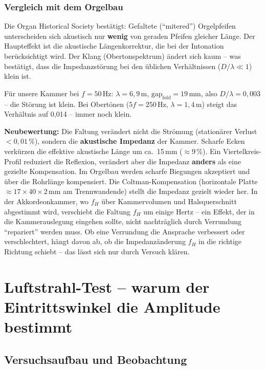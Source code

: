 \documentclass[11pt,a4paper]{article}
\begin{document}
\subsubsection{Vergleich mit dem Orgelbau}

Die Organ Historical Society bestätigt: Gefaltete (``mitered'') Orgelpfeifen unterscheiden sich akustisch nur \textbf{wenig} von geraden Pfeifen gleicher Länge. Der Haupteffekt ist die akustische Längenkorrektur, die bei der Intonation berücksichtigt wird. Der Klang (Obertonspektrum) ändert sich kaum -- was bestätigt, dass die Impedanzstörung bei den üblichen Verhältnissen ($D/\lambda \ll 1$) klein ist.

Für unsere Kammer bei $f = 50$\,Hz: $\lambda = 6{,}9$\,m, $\text{gap}_\text{fold} = 19$\,mm, also $D/\lambda = 0{,}003$ -- die Störung ist klein. Bei Obertönen ($5f = 250$\,Hz, $\lambda = 1{,}4$\,m) steigt das Verhältnis auf 0{,}014 -- immer noch klein.

\begin{keybox}
\textbf{Neubewertung:} Die Faltung verändert nicht die Strömung (stationärer Verlust $< 0{,}01\,\%$), sondern die \textbf{akustische Impedanz} der Kammer. Scharfe Ecken verkürzen die effektive akustische Länge um ca.\ 15\,mm ($\approx 9\,\%$). Ein Viertelkreis-Profil reduziert die Reflexion, verändert aber die Impedanz \textbf{anders} als eine gezielte Kompensation. Im Orgelbau werden scharfe Biegungen akzeptiert und über die Rohrlänge kompensiert. Die Coltman-Kompensation (horizontale Platte $\approx 17 \times 40 \times 2$\,mm am Trennwandende) stellt die Impedanz gezielt wieder her. In der Akkordeonkammer, wo $f_H$ über Kammervolumen und Halsquerschnitt abgestimmt wird, verschiebt die Faltung $f_H$ um einige Hertz -- ein Effekt, der in die Kammerauslegung eingehen sollte, nicht nachträglich durch Verrundung ``repariert'' werden muss. Ob eine Verrundung die Ansprache verbessert oder verschlechtert, hängt davon ab, ob die Impedanzänderung $f_H$ in die richtige Richtung schiebt -- das lässt sich nur durch Versuch klären.
\end{keybox}

\section[Luftstrahl-Test]{Luftstrahl-Test -- warum der Eintrittswinkel die Amplitude bestimmt}

\subsection{Versuchsaufbau und Beobachtung}
\end{document}

